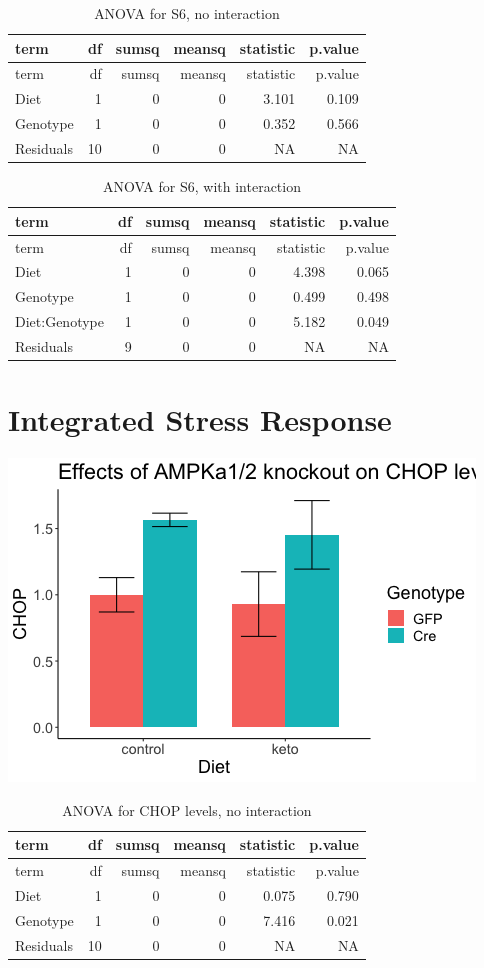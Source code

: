 \documentclass[
]{article}
\begin{document}
\begin{longtable}[]{@{}lrrrrr@{}}
\caption{ANOVA for S6, no interaction}\tabularnewline
\toprule
term & df & sumsq & meansq & statistic & p.value\tabularnewline
\midrule
\endfirsthead
\toprule
term & df & sumsq & meansq & statistic & p.value\tabularnewline
\midrule
\endhead
Diet & 1 & 0 & 0 & 3.101 & 0.109\tabularnewline
Genotype & 1 & 0 & 0 & 0.352 & 0.566\tabularnewline
Residuals & 10 & 0 & 0 & NA & NA\tabularnewline
\bottomrule
\end{longtable}

\begin{longtable}[]{@{}lrrrrr@{}}
\caption{ANOVA for S6, with interaction}\tabularnewline
\toprule
term & df & sumsq & meansq & statistic & p.value\tabularnewline
\midrule
\endfirsthead
\toprule
term & df & sumsq & meansq & statistic & p.value\tabularnewline
\midrule
\endhead
Diet & 1 & 0 & 0 & 4.398 & 0.065\tabularnewline
Genotype & 1 & 0 & 0 & 0.499 & 0.498\tabularnewline
Diet:Genotype & 1 & 0 & 0 & 5.182 & 0.049\tabularnewline
Residuals & 9 & 0 & 0 & NA & NA\tabularnewline
\bottomrule
\end{longtable}

\hypertarget{integrated-stress-response}{%
\section{Integrated Stress Response}\label{integrated-stress-response}}

\includegraphics{figures/chop-barplot-1.png}

\begin{longtable}[]{@{}lrrrrr@{}}
\caption{ANOVA for CHOP levels, no interaction}\tabularnewline
\toprule
term & df & sumsq & meansq & statistic & p.value\tabularnewline
\midrule
\endfirsthead
\toprule
term & df & sumsq & meansq & statistic & p.value\tabularnewline
\midrule
\endhead
Diet & 1 & 0 & 0 & 0.075 & 0.790\tabularnewline
Genotype & 1 & 0 & 0 & 7.416 & 0.021\tabularnewline
Residuals & 10 & 0 & 0 & NA & NA\tabularnewline
\bottomrule
\end{longtable}
\end{document}
